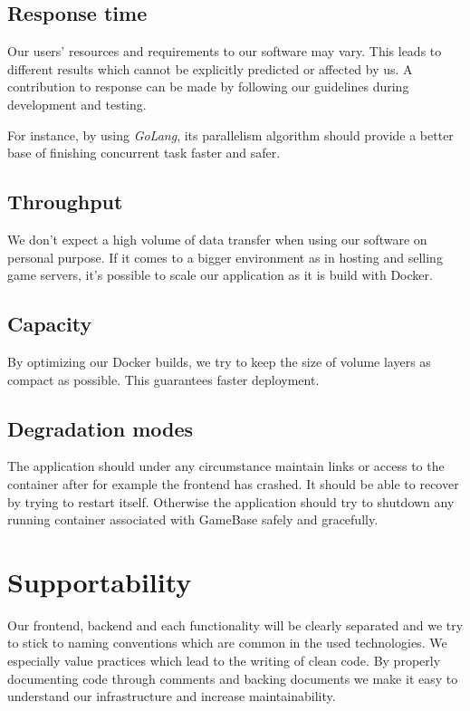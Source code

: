\documentclass[a4paper,12pt,chapterprefix=false,bibliography=totoc,listof=totoc,]{scrreprt}
\begin{document}
\subsection{Response time}
Our users' resources and requirements to our software may vary. This leads to different results which cannot be explicitly predicted or affected by us. A contribution to response can be made by following our guidelines during development and testing.

For instance, by using \emph{GoLang}, its parallelism algorithm should provide a better base of finishing concurrent task faster and safer.

\subsection{Throughput}
We don't expect a high volume of data transfer when using our software on personal purpose. If it comes to a bigger environment as in hosting and selling game servers, it's possible to scale our application as it is build with Docker. 


\subsection{Capacity}
By optimizing our Docker builds, we try to keep the size of volume layers as compact as possible. This guarantees faster deployment.


\subsection{Degradation modes}
The application should under any circumstance maintain links or access to the container after for example the frontend has crashed. It should be able to recover by trying to restart itself. Otherwise the application should try to shutdown any running container associated with GameBase safely and gracefully. 


\section{Supportability}
{\color{magenta}
Our frontend, backend and each functionality will be clearly separated and we try to stick to naming conventions which are common in the used technologies. We especially value practices which lead to the writing of clean code. By properly documenting code through comments and backing documents we make it easy to understand our infrastructure and increase maintainability.
}
\end{document}
